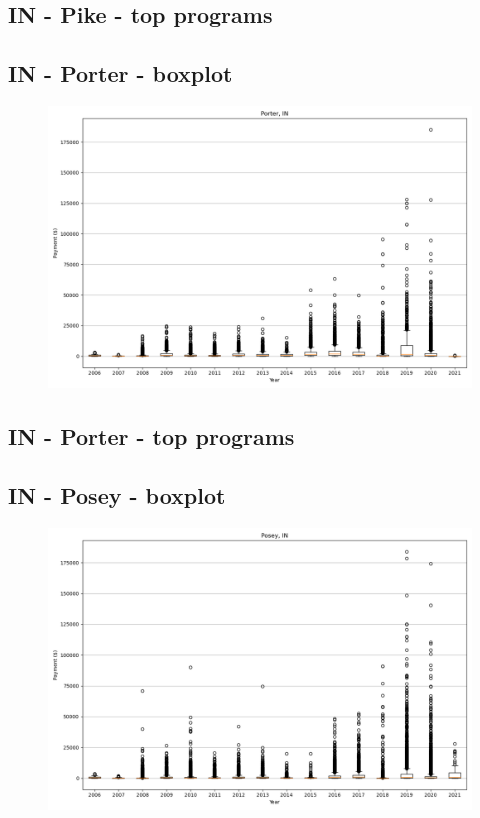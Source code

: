 \subsection*{IN - Pike - top programs}

\newpage
\subsection*{IN - Porter - boxplot}
\begin{figure}[h]
\centering
\includegraphics[width=7in]{../output/boxplots/counties/Porter-IN_boxplot.png}
\end{figure}


\subsection*{IN - Porter - top programs}

\newpage
\subsection*{IN - Posey - boxplot}
\begin{figure}[h]
\centering
\includegraphics[width=7in]{../output/boxplots/counties/Posey-IN_boxplot.png}
\end{figure}


